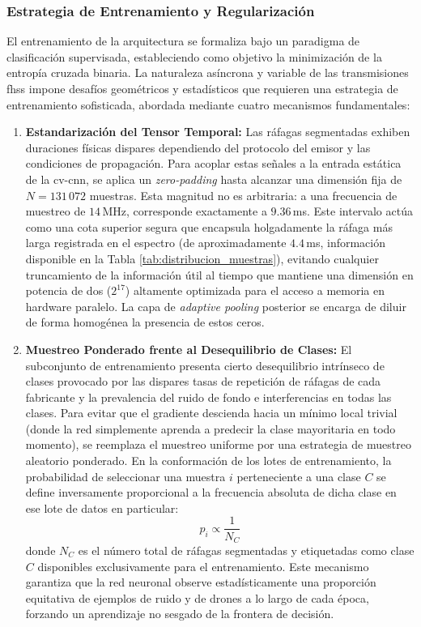 \subsubsection{Estrategia de Entrenamiento y Regularización}
El entrenamiento de la arquitectura se formaliza bajo un paradigma de clasificación supervisada, estableciendo como objetivo la minimización de la entropía cruzada binaria. La naturaleza asíncrona y variable de las transmisiones \gls{fhss} impone desafíos geométricos y estadísticos que requieren una estrategia de entrenamiento sofisticada, abordada mediante cuatro mecanismos fundamentales:
\begin{enumerate}
    \item \textbf{Estandarización del Tensor Temporal:}
    Las ráfagas segmentadas exhiben duraciones físicas dispares dependiendo del protocolo del emisor y las condiciones de propagación. Para acoplar estas señales a la entrada estática de la \gls{cv-cnn}, se aplica un \textit{zero-padding} hasta alcanzar una dimensión fija de $N = 131\,072$ muestras. Esta magnitud no es arbitraria: a una frecuencia de muestreo de $14$\,MHz, corresponde exactamente a $9.36$\,ms. Este intervalo actúa como una cota superior segura que encapsula holgadamente la ráfaga más larga registrada en el espectro (de aproximadamente $4.4$\,ms, información disponible en la Tabla \ref{tab:distribucion_muestras}), evitando cualquier truncamiento de la información útil al tiempo que mantiene una dimensión en potencia de dos ($2^{17}$) altamente optimizada para el acceso a memoria en hardware paralelo. La capa de \textit{adaptive pooling} posterior se encarga de diluir de forma homogénea la presencia de estos ceros.

    \item \textbf{Muestreo Ponderado frente al Desequilibrio de Clases:}
    El subconjunto de entrenamiento presenta cierto desequilibrio intrínseco de clases provocado por las dispares tasas de repetición de ráfagas de cada fabricante y la prevalencia del ruido de fondo e interferencias en todas las clases. Para evitar que el gradiente descienda hacia un mínimo local trivial (donde la red simplemente aprenda a predecir la clase mayoritaria en todo momento), se reemplaza el muestreo uniforme por una estrategia de muestreo aleatorio ponderado. En la conformación de los lotes de entrenamiento, la probabilidad de seleccionar una muestra $i$ perteneciente a una clase $C$ se define inversamente proporcional a la frecuencia absoluta de dicha clase en ese lote de datos en particular:
    \begin{equation}
        p_i \propto \frac{1}{N_C}
    \end{equation}
    donde $N_C$ es el número total de ráfagas segmentadas y etiquetadas como clase $C$ disponibles exclusivamente para el entrenamiento. Este mecanismo garantiza que la red neuronal observe estadísticamente una proporción equitativa de ejemplos de ruido y de drones a lo largo de cada época, forzando un aprendizaje no sesgado de la frontera de decisión.


\end{enumerate}
